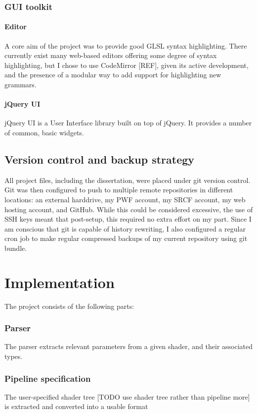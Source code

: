 \documentclass[12pt,twoside,notitlepage]{report}
\begin{document}
\subsection{GUI toolkit}
\subsubsection{Editor}
A core aim of the project was to provide good GLSL syntax highlighting. There currently exist many web-based editors offering some degree of syntax highlighting, but I chose to use CodeMirror [REF], given its active development, and the presence of a modular way to add support for highlighting new grammars. 

\subsubsection{jQuery UI}
jQuery UI is a User Interface library built on top of jQuery. It provides a number of common, basic widgets.

\section{Version control and backup strategy}
All project files, including the dissertation, were placed under git version control. Git was then configured to push to multiple remote repositories in different locations: an external harddrive, my PWF account, my SRCF account, my web hosting account, and GitHub. While this could be considered excessive, the use of SSH keys meant that post-setup, this required no extra effort on my part. Since I am conscious that git is capable of history rewriting, I also configured a regular cron job to make regular compressed backups of my current repository using git bundle.

\cleardoublepage
\chapter{Implementation}
The project consists of the following parts:
\subsection{Parser}
The parser extracts relevant parameters from a given shader, and their associated types.
\subsection{Pipeline specification}
The user-specified shader tree [TODO use shader tree rather than pipeline more] is extracted and converted into a usable format
\end{document}
